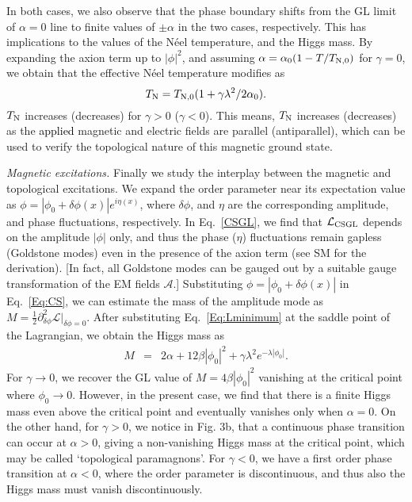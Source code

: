 \documentclass[aps,prl,showpacs,twocolumn,groupedaddress]{revtex4-1}
\newcommand{\blue}{\textcolor{black}}
\begin{document}
In both cases, we also observe that the phase boundary shifts from the GL limit of $\alpha=0$ line to finite values of $\pm\alpha$ in the two cases, respectively. This has implications to the values of the N\'eel temperature, and the Higgs mass. By expanding the axion term up to $|\phi|^2$, and assuming $\alpha=\alpha_0(1-T/T_{{\rm N},0})$ for $\gamma=0$, we obtain that the effective N\'eel temperature modifies as 
\begin{equation}
T_{\rm N}=T_{{\rm N},0}(1+\gamma\lambda^2/2\alpha_0).
\label{TN}
\end{equation}
$T_{\rm N}$ increases (decreases) for $\gamma>0$ ($\gamma<0$).  This means, $T_{\rm N}$ increases (decreases) as the \blue{applied} magnetic and electric fields are parallel (antiparallel), which can be used to verify the topological nature of this magnetic ground state. 

{\it Magnetic excitations.} Finally we study the interplay between the magnetic and topological excitations. We expand the order parameter near its expectation value as $\phi=|\phi_0 + \delta \phi(x)|e^{i\eta(x)}$, where $\delta \phi$, and $\eta$ are the corresponding amplitude, and phase fluctuations, respectively. In Eq.~\eqref{CSGL}, we find that $\mathcal{L}_{\rm CSGL}$ depends on the amplitude $|\phi|$ only, and thus the phase ($\eta$) fluctuations remain gapless (Goldstone modes) even in the presence of the axion term (see SM\cite{SM} for the derivation). [In fact, all Goldstone modes can be gauged out by a suitable gauge transformation of the EM fields $\mathcal{A}$.] Substituting $\phi=|\phi_0 + \delta \phi(x)|$ in Eq.~\eqref{Eq:CS}, we can estimate the mass of the amplitude mode as $M=\frac{1}{2}\partial^2_{\delta \phi}\mathcal{L}|_{{\delta \phi}=0}$. After substituting Eq.~\eqref{Eq:Lminimum} at the saddle point of the Lagrangian, we obtain the Higgs mass 
as
\begin{eqnarray}
M&=&2\alpha+12\beta|\phi_0|^2+\gamma\lambda^2e^{-\lambda |\phi_0|}.%
\end{eqnarray}
For $\gamma\rightarrow 0$, we recover the GL value of $M=4\beta|\phi_0|^2$ vanishing at the critical point where $\phi_0\rightarrow 0$. However, in the present case, we find that there is a finite Higgs mass even above the critical point and eventually vanishes only when $\alpha=0$. On the other hand, for $\gamma>0$, we notice in Fig. 3b, that a continuous phase transition can occur at $\alpha>0$, giving a non-vanishing Higgs mass at the critical point, which may be called `topological paramagnons'. For $\gamma<0$, we have a first order phase transition at $\alpha<0$, where the order parameter is discontinuous, and thus also the Higgs mass must vanish discontinuously.  
\end{document}
